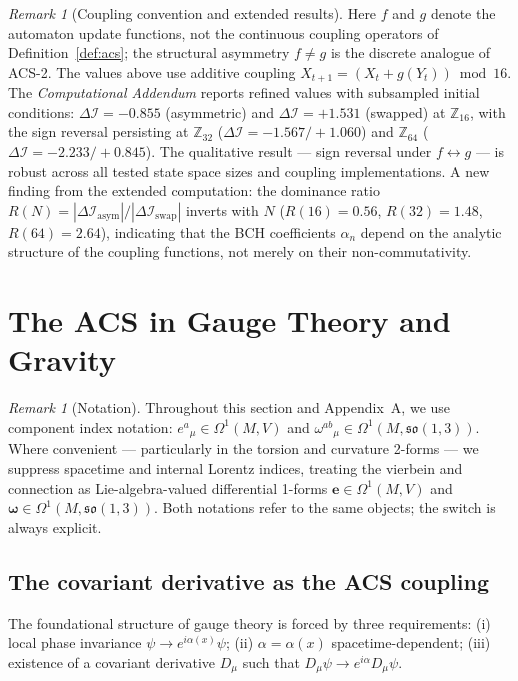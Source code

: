 \documentclass[12pt,a4paper]{article}
\theoremstyle{plain}
\theoremstyle{definition}
\theoremstyle{remark}
\newtheorem{remark}[theorem]{Remark}
\newcommand{\DI}{\Delta\mathcal{I}}
\begin{document}
\begin{remark}[Coupling convention and extended results]
Here $f$ and $g$ denote the automaton update functions, not the continuous
coupling operators of Definition~\ref{def:acs}; the structural asymmetry
$f \neq g$ is the discrete analogue of ACS-2.
The values above use additive coupling $X_{t+1} = (X_t + g(Y_t)) \bmod 16$.
The \textit{Computational Addendum} reports refined values with
subsampled initial conditions: $\DI = -0.855$ (asymmetric) and
$\DI = +1.531$ (swapped) at $\mathbb{Z}_{16}$, with the sign reversal
persisting at $\mathbb{Z}_{32}$ ($\DI = -1.567 / +1.060$) and
$\mathbb{Z}_{64}$ ($\DI = -2.233 / +0.845$).  The qualitative result
--- sign reversal under $f \leftrightarrow g$ --- is robust across all
tested state space sizes and coupling implementations.  A new finding
from the extended computation: the dominance ratio
$R(N) = |\DI_{\mathrm{asym}}|/|\DI_{\mathrm{swap}}|$ inverts with $N$
($R(16) = 0.56$, $R(32) = 1.48$, $R(64) = 2.64$), indicating that the
BCH coefficients $\alpha_n$ depend on the analytic structure of the
coupling functions, not merely on their non-commutativity.
\end{remark}

\section{The ACS in Gauge Theory and Gravity}
\label{sec:gauge}

\begin{remark}[Notation]
Throughout this section and Appendix~A, we use component index notation: $e^a{}_\mu \in \Omega^1(M, V)$ and $\omega^{ab}{}_\mu \in \Omega^1(M, \mathfrak{so}(1,3))$. Where convenient --- particularly in the torsion and curvature 2-forms --- we suppress spacetime and internal Lorentz indices, treating the vierbein and connection as Lie-algebra-valued differential 1-forms $\mathbf{e} \in \Omega^1(M, V)$ and $\boldsymbol{\omega} \in \Omega^1(M, \mathfrak{so}(1,3))$. Both notations refer to the same objects; the switch is always explicit.
\end{remark}

\subsection{The covariant derivative as the ACS coupling}

The foundational structure of gauge theory is forced by three requirements:
(i) local phase invariance $\psi \to e^{i\alpha(x)}\psi$;
(ii) $\alpha = \alpha(x)$ spacetime-dependent;
(iii) existence of a covariant derivative $D_\mu$ such that 
$D_\mu\psi \to e^{i\alpha} D_\mu\psi$.
\end{document}
